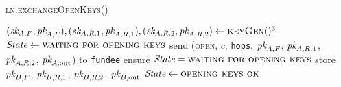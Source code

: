 \begin{center}
  \begin{processbox}{\textsc{ln.exchangeOpenKeys}()}
    \ \\
    \begin{algorithmic}[1]
      \State $(\textit{sk}_{A, F}, \textit{pk}_{A, F}), (\textit{sk}_{A, R, 1}, \textit{pk}_{A, R, 1}), (\textit{sk}_{A, R,
      2}, \textit{pk}_{A, R, 2}) \gets \textsc{keyGen}()^3$
      \State $\itistate \gets \textsc{waiting for opening keys}$
      \State send (\textsc{open}, $c$, \texttt{hops}, $\textit{pk}_{A, F}$, $\textit{pk}_{A, R,
      1}$, $\textit{pk}_{A, R, 2}$, $\textit{pk}_{A, \mathrm{out}}$) to \texttt{fundee}
      \label{code:ln:exchange-open-keys:bob-open}
      \State {}
      \State {}
      \State {}
      \State {}
      \State {}
       
        \State {}
        \State {} 
        \State {}
      \Else \: 
        \State {}
      \EndIf
      \State {}
      \label{code:ln:exchange-open-keys:accept-channel}
      \State ensure $\itistate = \textsc{waiting for opening keys}$
      \State store $\textit{pk}_{B, F}$, $\textit{pk}_{B, R, 1}$, $\textit{pk}_{B, R, 2}$, $\textit{pk}_{B,
      \mathrm{out}}$
      \State $\itistate \gets \textsc{opening keys ok}$
    \end{algorithmic}
  \end{processbox}
  \label{code:ln:exchange-open-keys}
\end{center} \ \\

